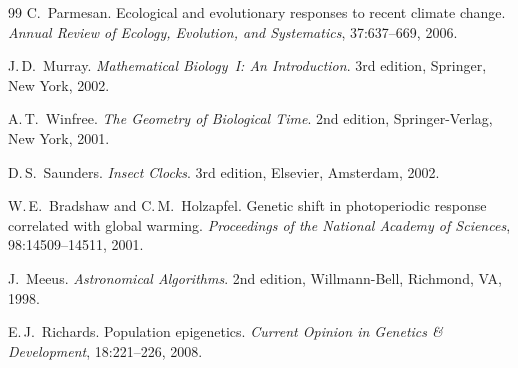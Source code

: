 ﻿\documentclass[12pt, a4paper]{article}
\theoremstyle{definition}
\begin{document}
\begin{thebibliography}{99}
C.~Parmesan.
\newblock Ecological and evolutionary responses to recent climate change.
\newblock \emph{Annual Review of Ecology, Evolution, and Systematics},
  37:637--669, 2006.
 
J.\,D.~Murray.
\newblock \emph{Mathematical Biology~I: An Introduction}.
\newblock 3rd edition, Springer, New York, 2002.
 
A.\,T.~Winfree.
\newblock \emph{The Geometry of Biological Time}.
\newblock 2nd edition, Springer-Verlag, New York, 2001.
 
D.\,S.~Saunders.
\newblock \emph{Insect Clocks}.
\newblock 3rd edition, Elsevier, Amsterdam, 2002.
 
W.\,E.~Bradshaw and C.\,M.~Holzapfel.
\newblock Genetic shift in photoperiodic response correlated with global
  warming.
\newblock \emph{Proceedings of the National Academy of Sciences}, 98:14509--14511,
  2001.
 
J.~Meeus.
\newblock \emph{Astronomical Algorithms}.
\newblock 2nd edition, Willmann-Bell, Richmond, VA, 1998.
 
E.\,J.~Richards.
\newblock Population epigenetics.
\newblock \emph{Current Opinion in Genetics \& Development}, 18:221--226, 2008.
 
\end{thebibliography}
\end{document}
